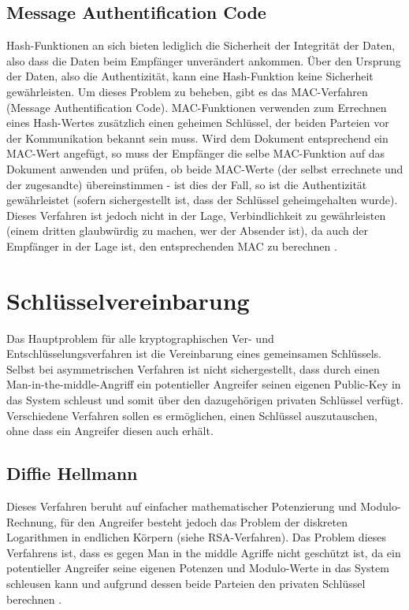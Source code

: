 \documentclass[10pt, a4paper,headsepline]{scrreprt}
\begin{document}
\subsection{Message Authentification Code}
Hash-Funktionen an sich bieten lediglich die Sicherheit der Integrität der Daten, also dass die Daten beim Empfänger unverändert ankommen. Über den Ursprung der Daten, also die Authentizität, kann eine Hash-Funktion keine Sicherheit gewährleisten. Um dieses Problem zu beheben, gibt es das MAC-Verfahren (Message Authentification Code). MAC-Funktionen verwenden zum Errechnen eines Hash-Wertes zusätzlich einen geheimen Schlüssel, der beiden Parteien vor der Kommunikation bekannt sein muss. Wird dem Dokument entsprechend ein MAC-Wert angefügt, so muss der Empfänger die selbe MAC-Funktion auf das Dokument anwenden und prüfen, ob beide MAC-Werte (der selbst errechnete und der zugesandte) übereinstimmen - ist dies der Fall, so ist die Authentizität gewährleistet (sofern sichergestellt ist, dass der Schlüssel geheimgehalten wurde). Dieses Verfahren ist jedoch nicht in der Lage, Verbindlichkeit zu gewährleisten (einem dritten glaubwürdig zu machen, wer der Absender ist), da auch der Empfänger in der Lage ist, den entsprechenden MAC zu berechnen \citep[S. 97ff] {book:practical-crypto}.


\section{Schlüsselvereinbarung} 
Das Hauptproblem für alle kryptographischen Ver- und Entschlüsselungsverfahren ist die Vereinbarung eines gemeinsamen Schlüssels. Selbst bei asymmetrischen Verfahren ist nicht sichergestellt, dass durch einen Man-in-the-middle-Angriff ein potentieller Angreifer seinen eigenen Public-Key in das System schleust und somit über den dazugehörigen privaten Schlüssel verfügt. Verschiedene Verfahren sollen es ermöglichen, einen Schlüssel auszutauschen, ohne dass ein Angreifer diesen auch erhält.

\subsection{Diffie Hellmann}
Dieses Verfahren beruht auf einfacher mathematischer Potenzierung und Modulo-Rechnung, für den Angreifer besteht jedoch das Problem der diskreten Logarithmen in endlichen Körpern (siehe RSA-Verfahren). Das Problem dieses Verfahrens ist, dass es gegen Man in the middle Agriffe nicht geschützt ist, da ein potentieller Angreifer seine eigenen Potenzen und Modulo-Werte in das System schleusen kann und aufgrund dessen beide Parteien den privaten Schlüssel berechnen \citep[S. 211]{book:practical-crypto} \citep[S. 587]{book:angewandte-krypto}.
\end{document}
